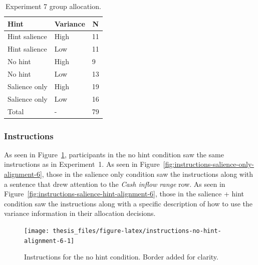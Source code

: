 \documentclass[a4paper, nobind, dvipsnames]{templates/ociamthesis}
\theoremstyle{definition}
\theoremstyle{definition}
\theoremstyle{definition}
\theoremstyle{definition}
\theoremstyle{remark}
\begin{document}
\begin{table}[tbp]

\begin{center}
\begin{threeparttable}

\caption{\label{tab:condition-allocation-alignment-6}Experiment 7 group allocation.}

\begin{tabular}{lll}
\toprule
Hint & \multicolumn{1}{c}{Variance} & \multicolumn{1}{c}{N}\\
\midrule
Hint salience & High & 11\\
Hint salience & Low & 11\\
No hint & High & 9\\
No hint & Low & 13\\
Salience only & High & 19\\
Salience only & Low & 16\\
Total & - & 79\\
\bottomrule
\end{tabular}

\end{threeparttable}
\end{center}

\end{table}

\subsubsection{Instructions}

As seen in Figure~\ref{fig:instructions-no-hint-alignment-6}, participants in
the no hint condition saw the same instructions as in Experiment~1. As seen in
Figure~\ref{fig:instructions-salience-only-alignment-6}, those in the salience
only condition saw the instructions along with a sentence that drew attention to
the \emph{Cash inflow range} row. As seen in
Figure~\ref{fig:instructions-salience-hint-alignment-6}, those in the
salience + hint condition saw the instructions along with a specific description
of how to use the variance information in their allocation decisions.



\begin{figure}
\texttt{[image: thesis\_files/figure-latex/instructions-no-hint-alignment-6-1]} \caption{Instructions for the no hint condition. Border added for clarity.}\label{fig:instructions-no-hint-alignment-6}
\end{figure}
\end{document}
